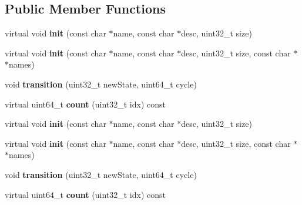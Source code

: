\subsection*{Public Member Functions}
\begin{DoxyCompactItemize}
\item 
\hypertarget{classCycleBreakdownStat_ae82676301f6d9fdf98d6f5605fa7f134}{virtual void {\bfseries init} (const char $\ast$name, const char $\ast$desc, uint32\-\_\-t size)}\label{classCycleBreakdownStat_ae82676301f6d9fdf98d6f5605fa7f134}

\item 
\hypertarget{classCycleBreakdownStat_af939f01118305ad8f50359b429fab8a7}{virtual void {\bfseries init} (const char $\ast$name, const char $\ast$desc, uint32\-\_\-t size, const char $\ast$$\ast$names)}\label{classCycleBreakdownStat_af939f01118305ad8f50359b429fab8a7}

\item 
\hypertarget{classCycleBreakdownStat_aec2e256c006156472689efd6e5b98e49}{void {\bfseries transition} (uint32\-\_\-t new\-State, uint64\-\_\-t cycle)}\label{classCycleBreakdownStat_aec2e256c006156472689efd6e5b98e49}

\item 
\hypertarget{classCycleBreakdownStat_a04f433528adb05a600e3a319315f2a9d}{virtual uint64\-\_\-t {\bfseries count} (uint32\-\_\-t idx) const }\label{classCycleBreakdownStat_a04f433528adb05a600e3a319315f2a9d}

\item 
\hypertarget{classCycleBreakdownStat_ae82676301f6d9fdf98d6f5605fa7f134}{virtual void {\bfseries init} (const char $\ast$name, const char $\ast$desc, uint32\-\_\-t size)}\label{classCycleBreakdownStat_ae82676301f6d9fdf98d6f5605fa7f134}

\item 
\hypertarget{classCycleBreakdownStat_af939f01118305ad8f50359b429fab8a7}{virtual void {\bfseries init} (const char $\ast$name, const char $\ast$desc, uint32\-\_\-t size, const char $\ast$$\ast$names)}\label{classCycleBreakdownStat_af939f01118305ad8f50359b429fab8a7}

\item 
\hypertarget{classCycleBreakdownStat_aec2e256c006156472689efd6e5b98e49}{void {\bfseries transition} (uint32\-\_\-t new\-State, uint64\-\_\-t cycle)}\label{classCycleBreakdownStat_aec2e256c006156472689efd6e5b98e49}

\item 
\hypertarget{classCycleBreakdownStat_a04f433528adb05a600e3a319315f2a9d}{virtual uint64\-\_\-t {\bfseries count} (uint32\-\_\-t idx) const }\label{classCycleBreakdownStat_a04f433528adb05a600e3a319315f2a9d}

\end{DoxyCompactItemize}
